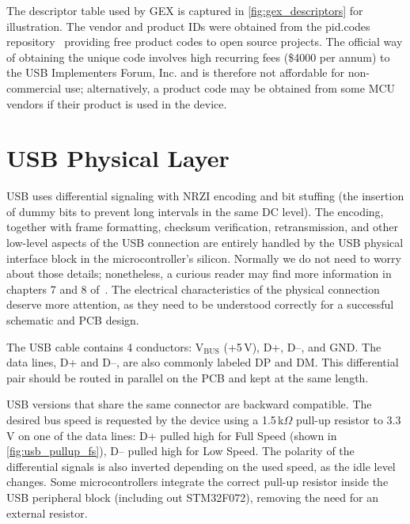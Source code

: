The descriptor table used by GEX is captured in \cref{fig:gex_descriptors} for illustration. The vendor and product IDs were obtained from the pid.codes repository~\cite{pidcodes} providing free product codes to open source projects. The official way of obtaining the unique code involves high recurring fees (\$4000 per annum) to the USB Implementers Forum, Inc. and is therefore not affordable for non-commercial use; alternatively, a product code may be obtained from some \gls{MCU} vendors if their product is used in the device.
\newpage



\section{USB Physical Layer}

\gls{USB} uses differential signaling with \gls{NRZI} encoding and bit stuffing (the insertion of dummy bits to prevent long intervals in the same \gls{DC} level). The encoding, together with frame formatting, checksum verification, retransmission, and other low-level aspects of the \gls{USB} connection are entirely handled by the \gls{USB} physical interface block in the microcontroller's silicon. Normally we do not need to worry about those details; nonetheless, a curious reader may find more information in chapters 7 and 8 of~\cite{usbif-spec}. The electrical characteristics of the physical connection deserve more attention, as they need to be understood correctly for a successful schematic and \gls{PCB} design.

The \gls{USB} cable contains 4 conductors: V$_\mathrm{BUS}$ (+5\,V), D+, D--, and \gls{GND}. The data lines, D+ and D--, are also commonly labeled DP and DM. This differential pair should be routed in parallel on the \gls{PCB} and kept at the same length.

\gls{USB} versions that share the same connector are backward compatible. The desired bus speed is requested by the device using a 1.5\,k$\Omega$ pull-up resistor to 3.3\,V on one of the data lines: D+ pulled high for Full Speed (shown in \cref{fig:usb_pullup_fs}), D-- pulled high for Low Speed. The polarity of the differential signals is also inverted depending on the used speed, as the idle level changes. Some microcontrollers integrate the correct pull-up resistor inside the \gls{USB} peripheral block (including out STM32F072), removing the need for an external resistor.

